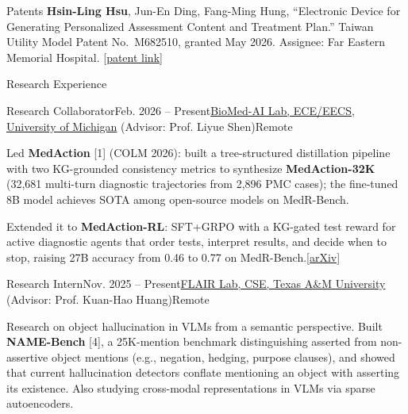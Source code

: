 \documentclass{resume} %
\newcommand{\lnk}[2]{\href{#1}{\textcolor{linkblue}{[#2]}}} %
\begin{document}
\begin{rSection}{Patents}
\textbf{Hsin-Ling Hsu}, Jun-En Ding, Fang-Ming Hung, ``Electronic Device for Generating Personalized Assessment Content and Treatment Plan.''
Taiwan Utility Model Patent No.~M682510, granted May 2026. Assignee: Far Eastern Memorial Hospital. \hspace{0.1cm}\lnk{https://patents.google.com/patent/TWM682510U/en}{patent link}
\end{rSection}


\begin{rSection}{Research Experience}

\begin{rSubsection}{Research Collaborator}{Feb. 2026 -- Present}{\href{https://liyueshen.engin.umich.edu/}{BioMed-AI Lab, ECE/EECS, University of Michigan} (Advisor: Prof. Liyue Shen)}{Remote}
  \item Led \textbf{MedAction} [1] (COLM 2026): built a tree-structured distillation pipeline with two KG-grounded consistency metrics to synthesize \textbf{MedAction-32K} (32,681 multi-turn diagnostic trajectories from 2,896 PMC cases); the fine-tuned 8B model achieves SOTA among open-source models on MedR-Bench.
  \item Extended it to \textbf{MedAction-RL}: SFT+GRPO with a KG-gated test reward for active diagnostic agents that order tests, interpret results, and decide when to stop, raising 27B accuracy from 0.46 to 0.77 on MedR-Bench.\hspace{0.1cm}\lnk{https://arxiv.org/abs/2605.07305}{arXiv}
\end{rSubsection}

\begin{rSubsection}{Research Intern}{Nov. 2025 -- Present}{\href{https://khhuang.me}{FLAIR Lab, CSE, Texas A\&M University} (Advisor: Prof. Kuan-Hao Huang)}{Remote}
  \item Research on object hallucination in VLMs from a semantic perspective. Built \textbf{NAME-Bench} [4], a 25K-mention benchmark distinguishing asserted from non-assertive object mentions (e.g., negation, hedging, purpose clauses), and showed that current hallucination detectors conflate mentioning an object with asserting its existence. Also studying cross-modal representations in VLMs via sparse autoencoders.
\end{rSubsection}


\end{rSection}
\end{document}
